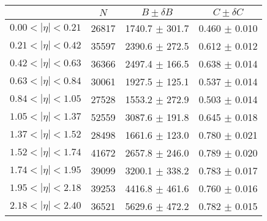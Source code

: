 \begin{tabular}{lccc}
\hline
    &   $N$   & $B \pm \delta B$  &  $C \pm \delta C$ \\
\hline
$0.00 < |\eta| <0.21$          & 26817      & 1740.7     $\pm$ 301.7 & 0.460      $\pm$ 0.010 \\
$0.21 < |\eta| <0.42$          & 35597      & 2390.6     $\pm$ 272.5 & 0.612      $\pm$ 0.012 \\
$0.42 < |\eta| <0.63$          & 36366      & 2497.4     $\pm$ 166.5 & 0.638      $\pm$ 0.014 \\
$0.63 < |\eta| <0.84$          & 30061      & 1927.5     $\pm$ 125.1 & 0.537      $\pm$ 0.014 \\
$0.84 < |\eta| <1.05$          & 27528      & 1553.2     $\pm$ 272.9 & 0.503      $\pm$ 0.014 \\
$1.05 < |\eta| <1.37$          & 52559      & 3087.6     $\pm$ 191.8 & 0.645      $\pm$ 0.018 \\
$1.37 < |\eta| <1.52$          & 28498      & 1661.6     $\pm$ 123.0 & 0.780      $\pm$ 0.021 \\
$1.52 < |\eta| <1.74$          & 41672      & 2657.8     $\pm$ 246.0 & 0.789      $\pm$ 0.020 \\
$1.74 < |\eta| <1.95$          & 39099      & 3200.1     $\pm$ 338.2 & 0.783      $\pm$ 0.017 \\
$1.95 < |\eta| <2.18$          & 39253      & 4416.8     $\pm$ 461.6 & 0.760      $\pm$ 0.016 \\
$2.18 < |\eta| <2.40$          & 36521      & 5629.6     $\pm$ 472.2 & 0.782      $\pm$ 0.015 \\
\hline
\end{tabular}
